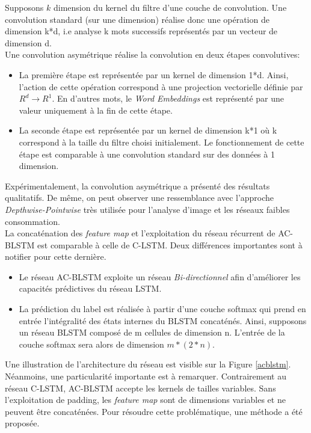 \noindent Supposons $k$ dimension du kernel du filtre d'une couche de convolution. Une convolution standard (sur une dimension) réalise donc une opération de dimension k*d, i.e analyse k mots successifs représentés par un vecteur de dimension d.\\

\noindent Une convolution asymétrique réalise la convolution en deux étapes convolutives:
\begin{itemize}
    \item La première étape est représentée par un kernel de dimension 1*d. Ainsi, l'action de cette opération correspond à une projection vectorielle définie par $R^d \longrightarrow R^1$. En d'autres mots, le \textit{Word Embeddings} est représenté par une valeur uniquement à la fin de cette étape.

    \item La seconde étape est représentée par un kernel de dimension k*1 où k correspond à la taille du filtre choisi initialement. Le fonctionnement de cette étape est comparable à une convolution standard sur des données à 1 dimension.
\end{itemize}

\noindent Expérimentalement, la convolution asymétrique a présenté des résultats qualitatifs. De même, on peut observer une ressemblance avec l'approche \textit{Depthwise-Pointwise} très utilisée pour l'analyse d'image et les réseaux faibles consommation.\\

\noindent La concaténation des \textit{feature map} et l'exploitation du réseau récurrent de AC-BLSTM est comparable à celle de C-LSTM. Deux différences importantes sont à notifier pour cette dernière.
\begin{itemize}
    \item Le réseau AC-BLSTM exploite un réseau \textit{Bi-directionnel} afin d'améliorer les capacités prédictives du réseau LSTM.

    \item La prédiction du label est réalisée à partir d'une couche softmax qui prend en entrée l'intégralité des états internes du BLSTM concaténés. Ainsi, supposons un réseau BLSTM composé de m cellules de dimension n. L'entrée de la couche softmax sera alors de dimension $m*(2*n)$.
\end{itemize}

\noindent Une illustration de l'architecture du réseau est visible sur la Figure \ref{acblstm}. Néanmoins, une particularité importante est à remarquer. Contrairement au réseau C-LSTM, AC-BLSTM accepte les kernels de tailles variables. Sans l'exploitation de padding, les \textit{feature map} sont de dimensions variables et ne peuvent être concaténées. Pour résoudre cette problématique, une méthode a été proposée.\\

